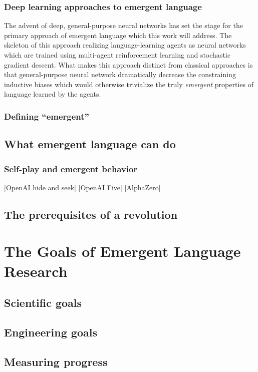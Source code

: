 \documentclass[letterpaper]{report}
\newcommand\cmg[1]{{\color{gray}[#1]}}
\begin{document}
\subsection{Deep learning approaches to emergent language}
The advent of deep, general-purpose neural networks has set the stage for the primary approach of emergent language which this work will address.
The skeleton of this approach realizing language-learning agents as neural networks which are trained using multi-agent reinforcement learning and stochastic gradient descent.
What makes this approach distinct from classical approaches is that general-purpose neural network dramatically decrease the constraining inductive biases which would otherwise trivialize the truly \emph{emergent} properties of language learned by the agents.

\subsection{Defining ``emergent''}

\section{What emergent language can do}
\subsection{Self-play and emergent behavior}
\cmg{OpenAI hide and seek}
\cmg{OpenAI Five}
\cmg{AlphaZero}
\section{The prerequisites of a revolution}

\chapter{The Goals of Emergent Language Research}
\section{Scientific goals}
\section{Engineering goals}
\section{Measuring progress}
\end{document}
